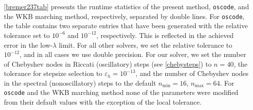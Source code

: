 \documentclass[10pt]{article}
\begin{document}
\cref{bremer237tab} presents the runtime statistics of the present method,
\texttt{oscode}, and the WKB marching method, respectively, separated by double
lines. For \texttt{oscode}, the table contains two separate entries that have
been generated with the relative tolerance set to $10^{-6}$ and $10^{-12}$,
respectively. This is reflected in the achieved error in the low-$\lambda$
limit. For all other solvers, we set the relative tolerance to $10^{-12}$, and
in all cases we use double precision. For our solver, we set the number of
Chebyshev nodes in Riccati (oscillatory) steps (see \cref{chebysteps}) to $n = 40$, the
tolerance for stepsize selection to $\varepsilon_h = 10^{-13}$, and the number
of Chebyshev nodes in the spectral (nonoscillatory) steps to the default
$n_{\text{min}} = 16$, $n_{\text{max}} = 64$. For \texttt{oscode} and the WKB
marching method none of the parameters were modified from their default values
with the exception of the local tolerance.
\end{document}
